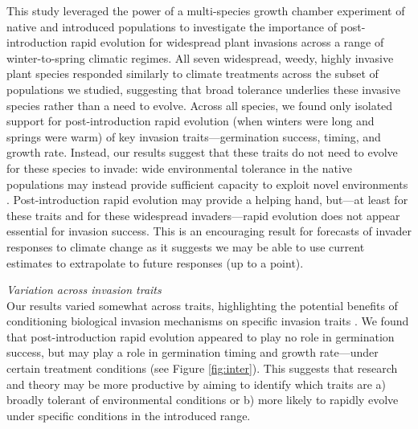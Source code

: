 \documentclass[11pt]{article}\usepackage[]{graphicx}\usepackage[]{color}
\begin{document}
	This study leveraged the power of a multi-species growth chamber experiment of native and introduced populations to investigate the importance of post-introduction rapid evolution for widespread plant invasions across a range of winter-to-spring climatic regimes.  All seven widespread, weedy, highly invasive plant species responded similarly to climate treatments across the subset of populations we studied, suggesting that broad tolerance underlies these invasive species rather than a need to evolve. Across all species, we found only isolated support for post-introduction rapid evolution (when winters were long and springs were warm) of key invasion traits---germination success, timing, and growth rate. Instead, our results suggest that these traits do not need to evolve for these species to invade:  wide environmental tolerance in the native populations may instead provide sufficient capacity to exploit novel environments \parencite{Baker1965}. Post-introduction rapid evolution may provide a helping hand, but---at least for these traits and for these widespread invaders---rapid evolution does not appear essential for invasion success. This is an encouraging result for forecasts of invader responses to climate change as it suggests we may be able to use current estimates to extrapolate to future responses (up to a point). %
	
\emph{Variation across invasion traits}\\ %
	Our results varied somewhat across traits, highlighting the potential benefits of conditioning biological invasion mechanisms on specific invasion traits \parencite{Maillet2000}.  We found that post-introduction rapid evolution appeared to play no role in germination success, but may play a role in germination timing and growth rate---under certain treatment conditions (see Figure \ref{fig:inter}). This suggests that research and theory may be more productive by aiming to identify which traits are a) broadly tolerant of environmental conditions or b) more likely to rapidly evolve under specific conditions in the introduced range. 
\end{document}
